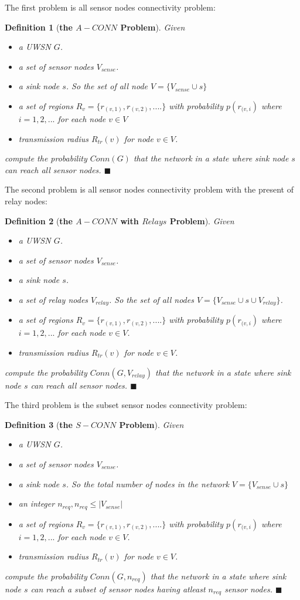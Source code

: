\documentclass[12pt]{article}
\newtheorem*{defi}{Definition}
\begin{document}
The first problem is all sensor nodes connectivity problem:
\begin{defi}[\textbf{the $A-CONN$ Problem}]
\normalfont
Given
\begin{itemize}[noitemsep]
\item a UWSN $G$.
\item a set of sensor nodes $V_{sense}$.
\item a sink node $s$. So the set of all node $V=\{V_{sense}\cup s\}$
\item  a set of regions  $R_v=\{r_{(v,1)},r_{(v,2)},....\}$  with probability $p(r_{(v,i})$ where $i=1,2,...$ for each node $v\in V$
\item transmission radius $R_{tr}(v)$  for node $v\in V$.
\end{itemize} compute the probability $Conn(G)$ that the network in a state where sink node $s$ can reach all sensor nodes. $\blacksquare$

\end{defi}
The second problem is all sensor nodes connectivity problem with the present of relay nodes:
\begin{defi}[\textbf{the $A-CONN$ with $Relays$ Problem}]
\normalfont
Given
\begin{itemize}[noitemsep]
\item a UWSN $G$.
\item a set of sensor nodes $V_{sense}$.
\item a sink node $s$.
\item a set of relay nodes $V_{relay}$. So the set of all nodes $V=\{V_{sense}\cup s \cup V_{relay}\}$.
\item  a set of regions  $R_v=\{r_{(v,1)},r_{(v,2)},....\}$  with probability $p(r_{(v,i})$ where $i=1,2,...$ for each node $v\in V$.
\item transmission radius $R_{tr}(v)$  for node $v\in V$.
\end{itemize} compute the probability $Conn(G,V_{relay})$ that the network in a state where sink node $s$ can reach all sensor nodes. $\blacksquare$
\end{defi}
The third problem is the subset sensor nodes connectivity problem:
\begin{defi}[\textbf{the $S-CONN$ Problem}]
\normalfont
Given
\begin{itemize}[noitemsep]
\item a UWSN $G$.
\item a set of sensor nodes $V_{sense}$.
\item a sink node $s$. So the total number of nodes in the network $V={\{V_{sense}\cup s\}}$
\item an integer $n_{req},n_{req}\leq |V_{sense}|$
\item  a set of regions  $R_v=\{r_{(v,1)},r_{(v,2)},....\}$  with probability $p(r_{(v,i})$ where $i=1,2,...$ for each node $v\in V$.
\item transmission radius $R_{tr}(v)$  for node $v\in V$.
\end{itemize} compute the probability $Conn(G,n_{req})$ that the network in a state where sink node $s$ can reach a subset of sensor nodes having atleast $n_{req}$ sensor nodes. $\blacksquare$
\end{defi}
\end{document}
